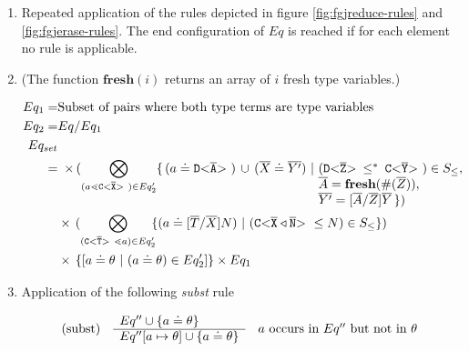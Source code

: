 \documentclass[acmsmall,screen,review]{acmart}
\begin{document}
\begin{enumerate}
\item Repeated application of the rules depicted in figure \ref{fig:fgjreduce-rules} and \ref{fig:fgjerase-rules}.
The end configuration of $Eq$ is reached if for each element
no rule is applicable.

\item
(The function $\textbf{fresh}(i)$ returns an array of $i$ fresh type variables.)

\begin{align*}
Eq_1 =& \text{Subset of pairs where both type terms are type variables}\\
Eq_2 =& Eq / Eq_1 \\
Eq_{set}\\ 
    = 
     & \begin{array}[t]{l@{\,}ll}
      \times \, (\displaystyle{\bigotimes_{(a \lessdot \exptype{C}{\ol{X}}) \in Eq'_2}}
      \{\,(a \doteq \exptype{D}{\ol{A}}) \, \cup \, (\ol{X} \doteq \ol{Y'}) \ | \ \sarray{@{}l}{
        (\exptype{D}{\ol{Z}} \olsub \exptype{C}{\ol{Y}}) \in S_\leq, \\
        \ol{A} = \textbf{fresh}(\#(\ol{Z})), \\
        \ol{Y'} = [\ol{A}/\ol{Z}]\ol{Y}
        \,\})}\\ 
      \end{array}\\
    & \times\, 
      (\displaystyle{\bigotimes_{(\exptype{C}{\overline{T}} \lessdot a) \in Eq'_2}}\!\!
      \set{(a \doteq [\ol{T}/\ol{X}]N ) \ | \ (\exptype{C}{\overline{X} \triangleleft \ol{N}} \leq N) \in
        S_\leq})\\
    & \times\, \set{[a \doteq \theta \ | \  (a \doteq \theta) \in Eq'_2]} \times Eq_1 \\
\end{align*}

\item \label{subst-step}  Application of the following \emph{subst} rule
    
      $$\begin{array}[c]{lll}
        (\mathrm{subst}) &
        \begin{array}[c]{l}
          Eq'' \cup \{ a \doteq \theta \}\\
          \hline
          Eq''[a \mapsto \theta] \cup \{ a \doteq \theta \}
        \end{array}
        & a \textrm{ occurs in } Eq'' \textrm{ but not in } \theta 
      \end{array}$$
      

\end{enumerate}
\end{document}
